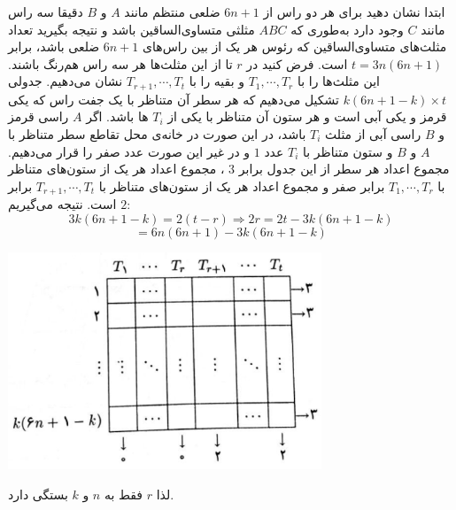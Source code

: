\p
ابتدا نشان دهید برای هر دو راس از
$6n + 1$
ضلعی منتظم مانند
$A$
و
$B$
دقیقا سه راس مانند
$C$
وجود دارد به‌طوری که
$ABC$
مثلثی متساوی‌الساقین باشد و نتیجه بگیرید تعداد مثلث‌های متساوی‌الساقین که رئوس هر یک از بین راس‌های
$6n + 1$
ضلعی باشد، برابر
$t = 3n(6n + 1)$
است. فرض کنید در
$r$
تا از این مثلث‌ها هر سه راس هم‌رنگ باشند. این مثلث‌ها را با
$T_1, \cdots, T_r$
و بقیه را با
$T_{r+1}, \cdots, T_t$
نشان می‌دهیم. جدولی
$k(6n + 1 - k) \times t$
تشکیل می‌دهیم که هر سطر آن متناظر با یک جفت راس که یکی قرمز و یکی آبی است و هر ستون آن متناظر با یکی از
$T_i$
ها باشد. اگر
$A$
راسی قرمز و
$B$
راسی آبی از مثلث
$T_i$
باشد، در این صورت در خانه‌ی محل تقاطع سطر متناظر با
$A$
و
$B$
و ستون متناظر با
$T_i$
عدد
$1$
و در غیر این صورت عدد صفر را قرار می‌دهیم. مجموع اعداد هر سطر از این جدول برابر
$3$
، مجموع اعداد هر یک از ستون‌های متناظر با
$T_1, \cdots, T_r$
برابر صفر و مجموع اعداد هر یک از ستون‌های متناظر با
$T_{r+1}, \cdots, T_t$
برابر
$2$
است. نتیجه می‌گیریم:
$$3k(6n + 1 - k) = 2(t - r) \Rightarrow 2r = 2t - 3k(6n + 1 - k)$$
$$= 6n(6n + 1) - 3k(6n + 1 - k)$$
\begin{center}
\includegraphics[height=6.5cm]{1.png}
\end{center}
لذا
$r$
فقط به
$n$
و
$k$
بستگی دارد.